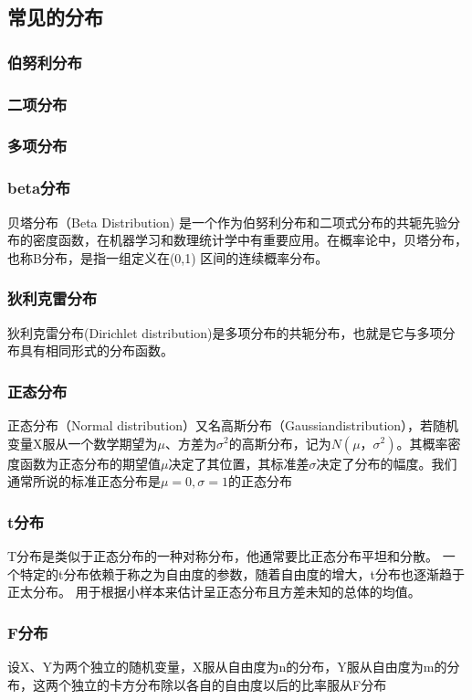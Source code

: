 \documentclass{scrartcl}
\numberwithin{equation}{section}   %
\begin{document}
\subsection{常见的分布}
\subsubsection{伯努利分布}
\subsubsection{二项分布}
\subsubsection{多项分布}
\subsubsection{beta分布}
贝塔分布（Beta Distribution) 是一个作为伯努利分布和二项式分布的共轭先验分布的密度函数，在机器学习和数理统计学中有重要应用。在概率论中，贝塔分布，也称Β分布，是指一组定义在(0,1) 区间的连续概率分布。

\subsubsection{狄利克雷分布}
狄利克雷分布(Dirichlet distribution)是多项分布的共轭分布，也就是它与多项分布具有相同形式的分布函数。


\subsubsection{正态分布}
正态分布（Normal distribution）又名高斯分布（Gaussiandistribution），若随机变量X服从一个数学期望为$μ$、方差为$σ^2$的高斯分布，记为$N(μ，σ^2)$。其概率密度函数为正态分布的期望值$μ$决定了其位置，其标准差$σ$决定了分布的幅度。我们通常所说的标准正态分布是$μ = 0,σ = 1$的正态分布

\subsubsection{t分布}
T分布是类似于正态分布的一种对称分布，他通常要比正态分布平坦和分散。 一个特定的t分布依赖于称之为自由度的参数，随着自由度的增大，t分布也逐渐趋于正太分布。 用于根据小样本来估计呈正态分布且方差未知的总体的均值。
\subsubsection{F分布}
设X、Y为两个独立的随机变量，X服从自由度为n的分布，Y服从自由度为m的分布，这两个独立的卡方分布除以各自的自由度以后的比率服从F分布
\end{document}

